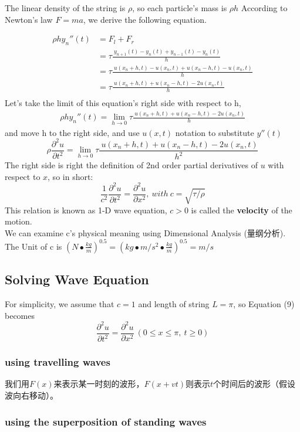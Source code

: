\documentclass[UTF8,10pt,a4paper]{ctexart}
\begin{document}
		
		
		\noindent
		The linear density of the string is $\rho$, so each particle's mass is $\rho h$
		According to Newton's law $F=ma$, we derive the following equation.
		
		\begin{align*}
		\rho h y_n''(t) &= F_l+F_r \\
                        &= \tau\frac{\ y_{n+1}(t)-y_{n}(t)+y_{n-1}(t)-y_n(t)}{h} \\
                        &= \tau\frac{\ u(x_n+h,t)-u(x_n,t)+u(x_n-h,t)-u(x_n,t)}{h}  \\
                        &= \tau\frac{\ u(x_n+h,t)+u(x_n-h,t)-2u(x_n,t)}{h}  \\                        
		\end{align*}
		Let's take the limit of this equation's right side with respect to h,
		\begin{align*}
			\rho h y_n''(t) = \lim_{h\to 0}\tau\frac{\ u(x_n+h,t)+u(x_n-h,t)-2u(x_n,t)}{h} 
		\end{align*}
		\noindent
		and move h to the right side, and use $u(x,t)$ notation to substitute $y{''}(t)$
		\begin{equation}
			\rho \frac{\partial^2 u}{\partial t^2} = \lim_{h\to 0}\tau\frac{\ u(x_n+h,t)+u(x_n-h,t)-2u(x_n,t)}{h^2} 
		\end{equation}
		\noindent
		The right side is right the definition of 2nd order partial derivatives of $u$ with respect to $x$, 
		so in short:
		\begin{equation}
			\frac{1}{c^2}\frac{\partial^2 u}{\partial t^2}=\frac{\partial^2 u}{\partial x^2},\ with\ c=\sqrt{\tau/\rho}
		\end{equation}
		This relation is known as 1-D wave equation, $c>0$ is called the \textbf{velocity} of the motion.\\
		We can examine c's physical meaning using Dimensional Analysis (量纲分析).\\
		The Unit of c is $(N \bullet \frac{kg}{m})^{0.5}=(kg \bullet m/s^2 \bullet \frac{kg}{m})^{0.5}=m/s$
	\subsection{Solving Wave Equation}
		For simplicity, we assume that $c=1$ and length of string $L=\pi$, so Equation (9) becomes
		\begin{equation}
			\frac{\partial^2 u}{\partial t^2} = \frac{\partial^2 u}{\partial x^2}\ (0\leqslant x \leqslant \pi,\ t\geqslant 0)
		\end{equation}				
		
		\subsubsection{using travelling waves}
		我们用$F(x)$来表示某一时刻的波形，$F(x+vt)$则表示$t$个时间后的波形（假设波向右移动）。
		\subsubsection{using the superposition of standing waves}
\end{document}
